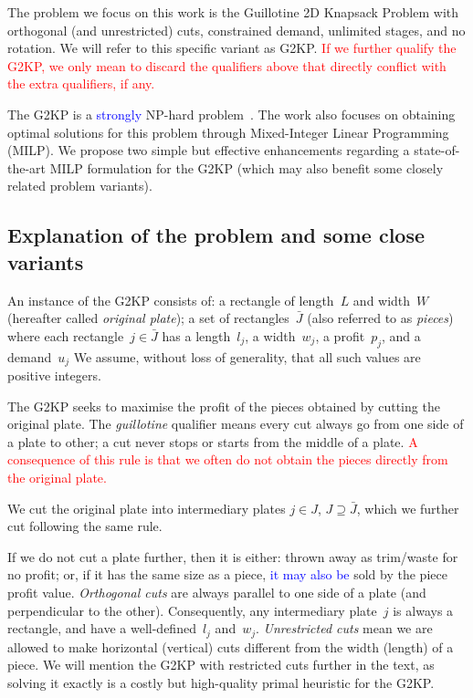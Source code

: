 \documentclass[smallextended]{svjour3}       %
\newif\iffinalversion
\newcommand{\newtext}[1]{\iffinalversion%
#1%
\else%
\textcolor{blue}{#1}%
\fi%
}
\newcommand{\oldtext}[1]{\iffinalversion%
\else%
\textcolor{red}{#1}%
\fi%
}
\begin{document}
The problem we focus on this work is the Guillotine 2D Knapsack Problem with orthogonal (and unrestricted) cuts, constrained demand, unlimited stages, and no rotation.
We will refer to this specific variant as G2KP.
\oldtext{If we further qualify the G2KP, we only mean to discard the qualifiers above that directly conflict with the extra qualifiers, if any.}
The G2KP is a \newtext{strongly} NP-hard problem~\cite{russo:2020}.
The work also focuses on obtaining optimal solutions for this problem through Mixed-Integer Linear Programming (MILP).
We propose two simple but effective enhancements regarding a state-of-the-art MILP formulation for the G2KP (which may also benefit some closely related problem variants).

\subsection{Explanation of the problem and some close variants}

An instance of the G2KP consists of: a rectangle of length~\(L\) and width~\(W\) (hereafter called \emph{original plate}); a set of rectangles~\(\bar{J}\) (also referred to as \emph{pieces}) where each rectangle~\(j \in \bar{J}\) has a length~\(l_j\), a width~\(w_j\), a profit~\(p_j\), and a demand~\(u_j\)
We assume, without loss of generality, that all such values are positive integers.

The G2KP seeks to maximise the profit of the pieces obtained by cutting the original plate.
The \emph{guillotine} qualifier means every cut always go from one side of a plate to other; a cut never stops or starts from the middle of a plate.
\oldtext{A consequence of this rule is that we often do not obtain the pieces directly from the original plate.}
We cut the original plate into intermediary plates \(j \in J\), \(J \supseteq \bar{J}\), which we further cut following the same rule.

If we do not cut a plate further, then it is either: thrown away as trim/waste for no profit; or, if it has the same size as a piece, \newtext{it may also be} sold by the piece profit value.
\emph{Orthogonal cuts} are always parallel to one side of a plate (and perpendicular to the other).
Consequently, any intermediary plate~\(j\) is always a rectangle, and have a well-defined~\(l_j\) and~\(w_j\).
\emph{Unrestricted cuts} mean we are allowed to make horizontal (vertical) cuts different from the width (length) of a piece.
We will mention the G2KP with restricted cuts further in the text, as solving it exactly is a costly but high-quality primal heuristic for the G2KP.
\end{document}
